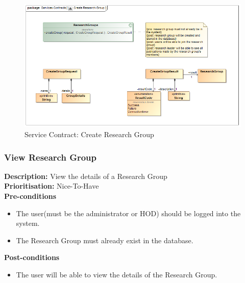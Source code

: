 \documentclass[a4paper]{article}
\begin{document}
    	    	\begin{figure}[H]
    	    		\centering
    	    		\includegraphics[width=\textwidth]{../Assignment1/5.1.11.Create.Research.Group.Services.Contract.png}
    	    		\caption{Service Contract: Create Research Group}
    	    	\end{figure}
    	
    	\pagebreak
    \subsubsection{View Research Group}
    	\textbf{Description:} View the details of a Research Group \\
    	\textbf{Prioritisation:} Nice-To-Have\\
    	
    	\textbf{Pre-conditions}
    	 \begin{itemize}
    		\item The user(must be the administrator or HOD) should be logged into the system.
    		\item The Research Group must already exist in the database.
        \end{itemize}
    	
    	\textbf{Post-conditions}
    	 \begin{itemize}
    		\item The user will be able to view the details of the Research Group.
    	\end{itemize}
    	
\end{document}

